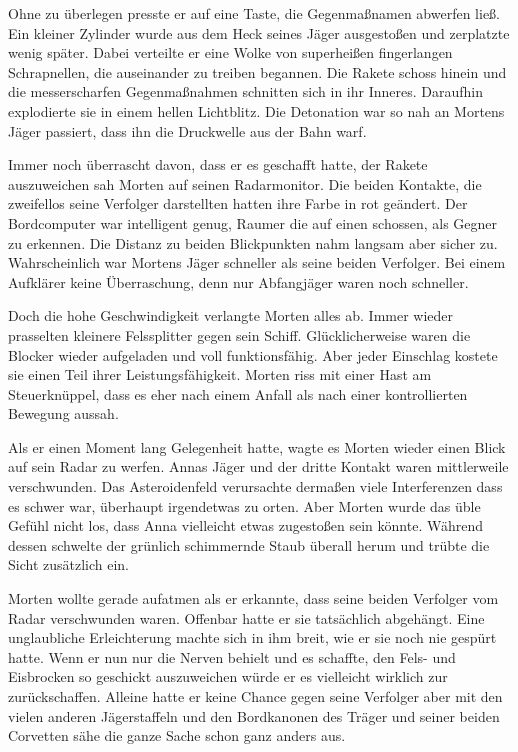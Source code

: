 \par

Ohne zu überlegen presste er auf eine Taste, die Gegenmaßnamen abwerfen ließ. Ein kleiner Zylinder wurde aus dem Heck seines Jäger ausgestoßen und zerplatzte wenig später. Dabei verteilte er eine Wolke von superheißen fingerlangen Schrapnellen, die auseinander zu treiben begannen. Die Rakete schoss hinein und die messerscharfen Gegenmaßnahmen schnitten sich in ihr Inneres. Daraufhin explodierte sie in einem hellen Lichtblitz. Die Detonation war so nah an Mortens Jäger passiert, dass ihn die Druckwelle aus der Bahn warf.

\par

Immer noch überrascht davon, dass er es geschafft hatte, der Rakete auszuweichen sah Morten auf seinen Radarmonitor. Die beiden Kontakte, die zweifellos seine Verfolger darstellten hatten ihre Farbe in rot geändert. Der Bordcomputer war intelligent genug, Raumer die auf einen schossen, als Gegner zu erkennen. Die Distanz zu beiden Blickpunkten nahm langsam aber sicher zu. Wahrscheinlich war Mortens Jäger schneller als seine beiden Verfolger. Bei einem Aufklärer keine Überraschung, denn nur Abfangjäger waren noch schneller.

\par

Doch die hohe Geschwindigkeit verlangte Morten alles ab. Immer wieder prasselten kleinere Felssplitter gegen sein Schiff. Glücklicherweise waren die Blocker wieder aufgeladen und voll funktionsfähig. Aber jeder Einschlag kostete sie einen Teil ihrer Leistungsfähigkeit. Morten riss mit einer Hast am Steuerknüppel, dass es eher nach einem Anfall als nach einer kontrollierten Bewegung aussah.

\par

Als er einen Moment lang Gelegenheit hatte, wagte es Morten wieder einen Blick auf sein Radar zu werfen. Annas Jäger und der dritte Kontakt waren mittlerweile verschwunden. Das Asteroidenfeld verursachte dermaßen viele Interferenzen dass es schwer war, überhaupt irgendetwas zu orten. Aber Morten wurde das üble Gefühl nicht los, dass Anna vielleicht etwas zugestoßen sein könnte. Während dessen schwelte der grünlich schimmernde Staub überall herum und trübte die Sicht zusätzlich ein.

\par

Morten wollte gerade aufatmen als er erkannte, dass seine beiden Verfolger vom Radar verschwunden waren. Offenbar hatte er sie tatsächlich abgehängt. Eine unglaubliche Erleichterung machte sich in ihm breit, wie er sie noch nie gespürt hatte. Wenn er nun nur die Nerven behielt und es schaffte, den Fels- und Eisbrocken so geschickt auszuweichen würde er es vielleicht wirklich zur  zurückschaffen. Alleine hatte er keine Chance gegen seine Verfolger aber mit den vielen anderen Jägerstaffeln und den Bordkanonen des Träger und seiner beiden Corvetten sähe die ganze Sache schon ganz anders aus.

